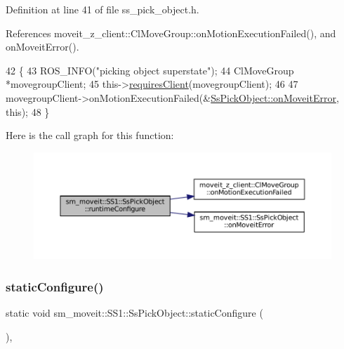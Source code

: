 Definition at line 41 of file ss\+\_\+pick\+\_\+object.\+h.



References moveit\+\_\+z\+\_\+client\+::\+Cl\+Move\+Group\+::on\+Motion\+Execution\+Failed(), and on\+Moveit\+Error().


\begin{DoxyCode}
42     \{
43         ROS\_INFO(\textcolor{stringliteral}{"picking object superstate"});
44         ClMoveGroup *movegroupClient;
45         this->\hyperlink{classsmacc_1_1ISmaccState_a7f95c9f0a6ea2d6f18d1aec0519de4ac}{requiresClient}(movegroupClient);
46 
47         movegroupClient->onMotionExecutionFailed(&\hyperlink{structsm__moveit_1_1SS1_1_1SsPickObject_aa5ad4c6436b70a13b27a45936876374c}{SsPickObject::onMoveitError}, \textcolor{keyword}{
      this});
48     \}
\end{DoxyCode}
Here is the call graph for this function\+:
\nopagebreak
\begin{figure}[H]
\begin{center}
\leavevmode
\includegraphics[width=350pt]{structsm__moveit_1_1SS1_1_1SsPickObject_acb8cbbad6e452a98ff2ccf93a6bdd1a4_cgraph}
\end{center}
\end{figure}
\mbox{\label{structsm__moveit_1_1SS1_1_1SsPickObject_ab589ae81913b79dda9f94d03e5b0fa86}} 
\subsubsection{\texorpdfstring{static\+Configure()}{staticConfigure()}}
{\footnotesize\ttfamily static void sm\+\_\+moveit\+::\+S\+S1\+::\+Ss\+Pick\+Object\+::static\+Configure (\begin{DoxyParamCaption}{ }\end{DoxyParamCaption})\hspace{0.3cm}{\ttfamily [inline]}, {\ttfamily [static]}}



